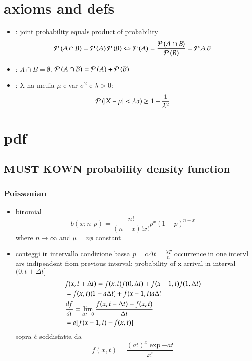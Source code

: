 \chapter{axioms and defs}
\begin{itemize}
\item {}: joint probability equals product of probability
\[\prob{(A\cap B)}=\prob{(A)}\prob{(B)}\Leftrightarrow \prob{(A)}=\frac{\prob{(A\cap B)}}{\prob{(B)}}=\prob{A|B}\]
\item {}: $A\cap B=\emptyset$, $\prob{(A\cap B)}=\prob{(A)}+\prob{(B)}$
\item {}: X ha media $\mu$ e var $\sigma^2$ e $\lambda>0$:
\[\prob{(|X-\mu|<\lambda\sigma)}\geq1-\frac{1}{\lambda^2}\]

\end{itemize}

\chapter{pdf}

\section{MUST KOWN probability density function}

\subsection{Poissonian}

\begin{itemize}
\item binomial
\[b(x;n,p)=\frac{n!}{(n-x)!x!}p^x(1-p)^{n-x}\]
where $n\to\infty$ and $\mu=np$ constant

\item conteggi in intervallo condizione bassa $p=c\Delta t=\frac{\lambda T}{n}$ occurrence in one intervl are indipendent from previous interval: probability of x arrival in interval $(0,t+\Delta t]$
\begin{align*}
&f(x,t+\Delta t)=f(x,t)f(0,\Delta t)+f(x-1,t)f(1,\Delta t)\\
&=f(x,t)(1-a\Delta t)+f(x-1,t)a\Delta t\\
&\TDy{t}{f}=\lim_{\Delta t\to0}\frac{f(x,t+\Delta t)-f(x,t)}{\Delta t}\\
&=a[f(x-1,t)-f(x,t)]
\end{align*}
sopra \'e soddisfatta da
\[f(x,t)=\frac{(at)^x\exp{-at}}{x!}\]
\end{itemize}